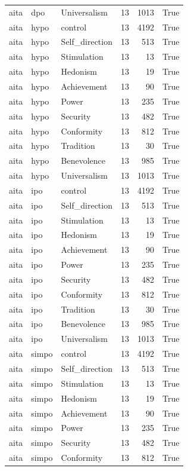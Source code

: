 \begin{tabular}{lllrrr}
aita & dpo & Universalism & 13 & 1013 & True \\
aita & hypo & control & 13 & 4192 & True \\
aita & hypo & Self\_direction & 13 & 513 & True \\
aita & hypo & Stimulation & 13 & 13 & True \\
aita & hypo & Hedonism & 13 & 19 & True \\
aita & hypo & Achievement & 13 & 90 & True \\
aita & hypo & Power & 13 & 235 & True \\
aita & hypo & Security & 13 & 482 & True \\
aita & hypo & Conformity & 13 & 812 & True \\
aita & hypo & Tradition & 13 & 30 & True \\
aita & hypo & Benevolence & 13 & 985 & True \\
aita & hypo & Universalism & 13 & 1013 & True \\
aita & ipo & control & 13 & 4192 & True \\
aita & ipo & Self\_direction & 13 & 513 & True \\
aita & ipo & Stimulation & 13 & 13 & True \\
aita & ipo & Hedonism & 13 & 19 & True \\
aita & ipo & Achievement & 13 & 90 & True \\
aita & ipo & Power & 13 & 235 & True \\
aita & ipo & Security & 13 & 482 & True \\
aita & ipo & Conformity & 13 & 812 & True \\
aita & ipo & Tradition & 13 & 30 & True \\
aita & ipo & Benevolence & 13 & 985 & True \\
aita & ipo & Universalism & 13 & 1013 & True \\
aita & simpo & control & 13 & 4192 & True \\
aita & simpo & Self\_direction & 13 & 513 & True \\
aita & simpo & Stimulation & 13 & 13 & True \\
aita & simpo & Hedonism & 13 & 19 & True \\
aita & simpo & Achievement & 13 & 90 & True \\
aita & simpo & Power & 13 & 235 & True \\
aita & simpo & Security & 13 & 482 & True \\
aita & simpo & Conformity & 13 & 812 & True \\

\end{tabular}
